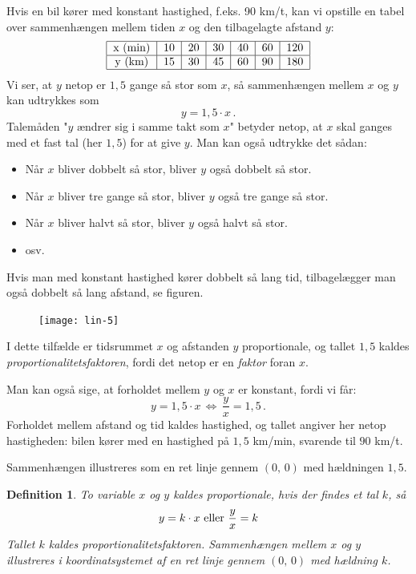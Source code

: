 \documentclass[12pt,oneside,a4paper]{article}
\newtheorem{mydef}[thm]{Definition}
\begin{document}
Hvis en bil kører med konstant hastighed, f.eks. 90 km/t, kan vi opstille en
tabel over sammenhængen mellem tiden $x$ og den tilbagelagte afstand $y$:
\[
\begin{tabular}{|c|c|c|c|c|c|c|}
    \hline
    x ({\rm min}) & 10 & 20 & 30 & 40 & 60 & 120 \\
    \hline
    y ({\rm km})  & 15 & 30 & 45 & 60 & 90 & 180  \\
    \hline
\end{tabular}
\]
Vi ser, at $y$ netop er $1,5$ gange så stor som $x$, så sammenhængen mellem $x$
og $y$ kan udtrykkes som
\[
y = 1,5\cdot x \,.
\]
Talemåden "$y$ ændrer sig i samme takt som $x$" betyder netop, at $x$ skal
ganges med et fast tal (her $1,5$) for at give $y$. Man kan også udtrykke det
sådan:
\begin{itemize}
    \item Når $x$ bliver dobbelt så stor, bliver $y$ også dobbelt så stor.
    \item Når $x$ bliver tre gange så stor, bliver $y$ også tre gange så stor.
    \item Når $x$ bliver halvt så stor, bliver $y$ også halvt så stor.
    \item osv.
\end{itemize}
Hvis man med konstant hastighed kører dobbelt så lang tid, tilbagelægger man
også dobbelt så lang afstand, se figuren.

\begin{figure}[H]
    \centering
    \texttt{[image: lin-5]}
\end{figure}

I dette tilfælde er tidsrummet $x$ og afstanden $y$ proportionale, og tallet
$1,5$ kaldes {\em proportionalitetsfaktoren}, fordi det netop er en {\em
faktor} foran $x$.

Man kan også sige, at forholdet mellem $y$ og $x$ er konstant, fordi vi får:
\[
y = 1,5\cdot x \, \Leftrightarrow \, \frac{y}{x} = 1,5 \,.
\]
Forholdet mellem afstand og tid kaldes hastighed, og tallet angiver her netop
hastigheden: bilen kører med en hastighed på $1,5$ km/min, svarende til $90$
km/t.

Sammenhængen illustreres som en ret linje gennem $(0,\,0)$ med hældningen $1,5$.

\begin{tcolorbox}
\begin{mydef}
    To variable $x$ og $y$ kaldes proportionale, hvis der findes et tal $k$, så
    $$
    y = k\cdot x \,\, {\rm eller} \,\, \frac{y}{x} = k
    $$
    Tallet $k$ kaldes proportionalitetsfaktoren. Sammenhængen mellem $x$ og $y$
    illustreres i koordinatsystemet af en ret linje gennem $(0,\,0)$ med 
    hældning $k$.
\end{mydef}
\end{tcolorbox}
\end{document}

